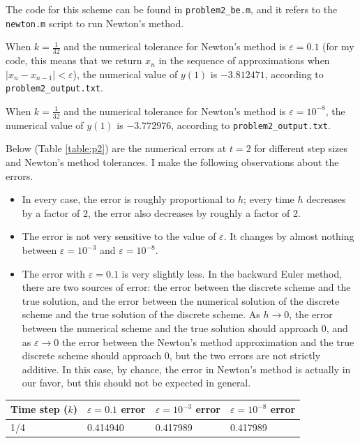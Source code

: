 \documentclass{homework}
\begin{document}
\begin{arabicparts}
		The code for this scheme can be found in \lstinline{problem2_be.m}, and it refers to the \lstinline{newton.m} script to run Newton's method.
		
		\questionpart When $k=\frac{1}{32}$ and the numerical tolerance for Newton's method is $\varepsilon = 0.1$ (for my code, this means that we return $x_n$ in the sequence of approximations when $|x_n - x_{n-1}| <\varepsilon$), the numerical value of $y(1)$ is $-3.812471$, according to \lstinline{problem2_output.txt}.
		
		\questionpart When $k=\frac{1}{32}$ and the numerical tolerance for Newton's method is $\varepsilon = 10^{-8}$, the numerical value of $y(1)$ is $-3.772976$, according to \lstinline{problem2_output.txt}.
		
		\questionpart Below (Table \ref{table:p2}) are the numerical errors at $t=2$ for different step sizes and Newton's method tolerances. I make the following observations about the errors.
		\begin{itemize}
			\item In every case, the error is roughly proportional to $h$; every time $h$ decreases by a factor of 2, the error also decreases by roughly a factor of 2. 
			\item The error is not very sensitive to the value of $\varepsilon$. It changes by almost nothing between $\varepsilon = 10^{-3}$ and $\varepsilon = 10^{-8}$.
			\item The error with $\varepsilon=0.1$ is very slightly less. In the backward Euler method, there are two sources of error: the error between the discrete scheme and the true solution, and the error between the numerical solution of the discrete scheme and the true solution of the discrete scheme. As $h \to 0$, the error between the numerical scheme and the true solution should approach 0, and as $\varepsilon \to 0$ the error between the Newton's method approximation and the true discrete scheme should approach 0, but the two errors are not strictly additive. In this case, by chance, the error in Newton's method is actually in our favor, but this should not be expected in general.
		\end{itemize}
		\begin{table}[htb]
			\centering
			\begin{tabular}{@{}llll@{}}
				\toprule
				Time step ($k$) & $\varepsilon = 0.1$ error & $\varepsilon=10^{-3}$ error & $\varepsilon =10^{-8}$ error \\
				\midrule
				1/4 & 0.414940 & 0.417989 & 0.417989 \\

\end{tabular}
\end{table}
\end{arabicparts}
\end{document}
